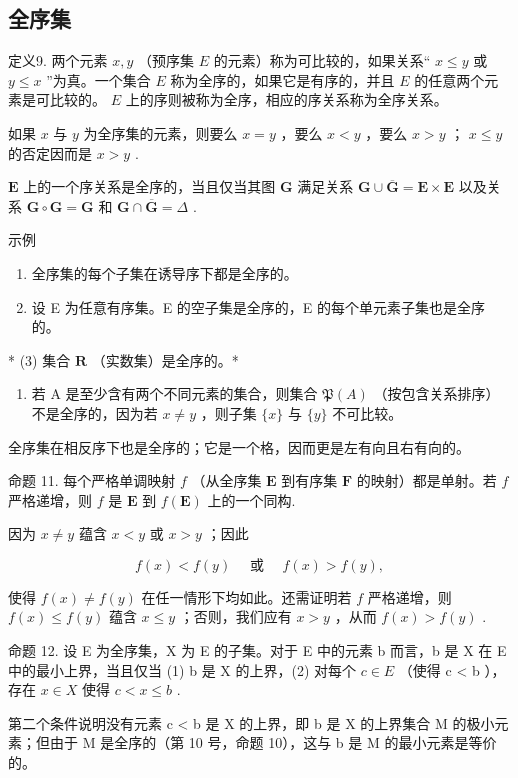 \subsection{全序集}

定义9. 两个元素 \(x, y\) （预序集 \(E\) 的元素）称为可比较的，如果关系“ \(x \leqslant y\) 或 \(y \leqslant x\) ”为真。一个集合 \(E\) 称为全序的，如果它是有序的，并且 \(E\) 的任意两个元素是可比较的。 \(E\) 上的序则被称为全序，相应的序关系称为全序关系。

如果 \(x\) 与 \(y\) 为全序集的元素，则要么 \(x = y\) ，要么 \(x < y\) ，要么 \(x > y\) ； \(x \leqslant y\) 的否定因而是 \(x > y\) .

 \(\mathbf{E}\) 上的一个序关系是全序的，当且仅当其图 \(\mathbf{G}\) 满足关系 \(\mathbf{G} \cup \overline{\mathbf{G}} = \mathbf{E} \times \mathbf{E}\) 以及关系 \(\mathbf{G} \circ \mathbf{G} = \mathbf{G}\) 和 \(\mathbf{G} \cap \overline{\mathbf{G}} = \Delta\) .

示例

\begin{enumerate}
\def\labelenumi{(\arabic{enumi})}
\item
  全序集的每个子集在诱导序下都是全序的。
\item
  设 E 为任意有序集。E 的空子集是全序的，E 的每个单元素子集也是全序的。
\end{enumerate}

* (3) 集合 \(\mathbf{R}\) （实数集）是全序的。*

\begin{enumerate}
\def\labelenumi{(\arabic{enumi})}
\setcounter{enumi}{3}
\tightlist
\item
  若 A 是至少含有两个不同元素的集合，则集合 \(\mathfrak{P}(A)\) （按包含关系排序）不是全序的，因为若 \(x \neq y\) ，则子集 \(\{x\}\) 与 \(\{y\}\) 不可比较。
\end{enumerate}

全序集在相反序下也是全序的；它是一个格，因而更是左有向且右有向的。

命题 11. 每个严格单调映射 \(f\) （从全序集 \(\mathbf{E}\) 到有序集 \(\mathbf{F}\) 的映射）都是单射。若 \(f\) 严格递增，则 \(f\) 是 \(\mathbf{E}\) 到 \(f(\mathbf{E})\) 上的一个同构.

因为 \(x \neq y\) 蕴含 \(x < y\) 或 \(x > y\) ；因此

\[
f (x) <   f (y) \quad \text { 或 } \quad f (x) > f (y),
\]

使得 \(f(x) \neq f(y)\) 在任一情形下均如此。还需证明若 \(f\) 严格递增，则 \(f(x) \leqslant f(y)\) 蕴含 \(x \leqslant y\) ；否则，我们应有 \(x > y\) ，从而 \(f(x) > f(y)\) .

命题 12. 设 E 为全序集，X 为 E 的子集。对于 E 中的元素 b 而言，b 是 X 在 E 中的最小上界，当且仅当 (1) b 是 X 的上界，(2) 对每个 \(c \in E\) （使得 c \textless{} b ），存在 \(x \in X\) 使得 \(c < x \leqslant b\) .

第二个条件说明没有元素 c \textless{} b 是 X 的上界，即 b 是 X 的上界集合 M 的极小元素；但由于 M 是全序的（第 10 号，命题 10），这与 b 是 M 的最小元素是等价的。

